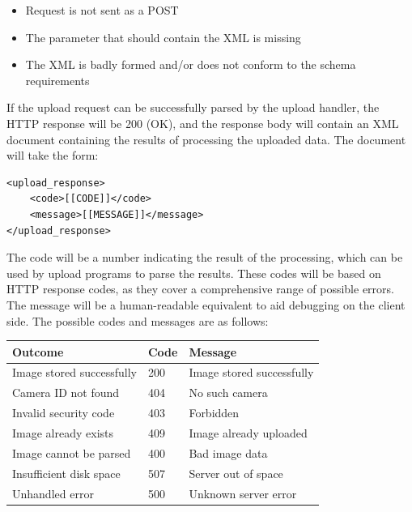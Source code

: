 \documentclass[11pt]{article}
\begin{document}
\begin{itemize}
    \item Request is not sent as a POST
    \item The parameter that should contain the XML is missing
    \item The XML is badly formed and/or does not conform to the schema requirements
\end{itemize}

If the upload request can be successfully parsed by the upload handler, the HTTP response will be 200 (OK), and the response body will contain an XML document containing the results of processing the uploaded data. The document will take the form:

\begin{verbatim}
<upload_response>
    <code>[[CODE]]</code>
    <message>[[MESSAGE]]</message>
</upload_response>
\end{verbatim}

The code will be a number indicating the result of the processing, which can be used by upload programs to parse the results. These codes will be based on HTTP response codes, as they cover a comprehensive range of possible errors. The message will be a human-readable equivalent to aid debugging on the client side. The possible codes and messages are as follows:

\begin{table}[h]
    \begin{tabular}{ | p{2in} | p{1in} | p{1.8in} | }
        \hline
        \textbf{Outcome} & \textbf{Code} & \textbf{Message} \\
        \hline
        Image stored successfully & 200 & Image stored successfully \\
        \hline
        Camera ID not found & 404 & No such camera \\
        \hline
        Invalid security code & 403 & Forbidden \\
        \hline
        Image already exists & 409 & Image already uploaded \\
        \hline
        Image cannot be parsed & 400 & Bad image data \\
        \hline
        Insufficient disk space & 507 & Server out of space \\
        \hline
        Unhandled error & 500 & Unknown server error \\
        \hline
    \end{tabular}
\end{table}
\end{document}
